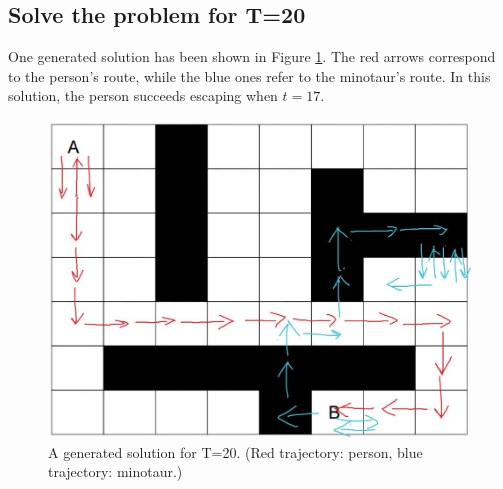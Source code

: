 \documentclass{article}
\begin{document}
\subsection{Solve the problem for T=20}
One generated solution has been shown in Figure \ref{solution}.
The red arrows correspond to the person's route, while the blue ones refer to the minotaur's route.
In this solution, the person succeeds escaping when $t=17$.
\begin{figure}[h]
  \centering
  \includegraphics[scale=0.4]{solution.jpg}
  \caption{A generated solution for T=20. (Red trajectory: person, blue trajectory: minotaur.)}
  \label{solution}
\end{figure}
\end{document}
